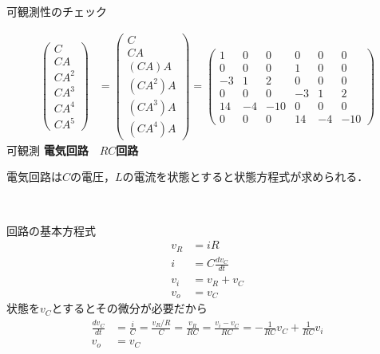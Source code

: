 \documentclass[a4paper,11pt]{jreport}
\begin{document}
可観測性のチェック

\begin{align}
 \left(\begin{array}{l}
        C \\
        CA \\
        CA^2  \\
	CA^3 \\
	CA^4 \\
	CA^5
       \end{array}\right)
 &=
 \left(\begin{array}{l}
        C \\
        CA \\
        (CA)A  \\
	(CA^2)A \\
	(CA^3)A \\
	(CA^4)A
       \end{array}\right)
 =
 \left(\begin{array}{rrrrrr}
        1 & 0 & 0 & 0 & 0 & 0      \\
        0 & 0 & 0 & 1 & 0 & 0      \\
        -3& 1 & 2 & 0 & 0 & 0      \\
	0 & 0 & 0 & -3& 1 & 2 \\
	14& -4&-10& 0 & 0 & 0 \\
	0 & 0 & 0 & 14& -4&-10
       \end{array}\right)
\nonumber
\end{align}
可観測
\newpage
\noindent
{\bf 電気回路　$RC$回路}

電気回路は$C$の電圧，$L$の電流を状態とすると状態方程式が求められる．
\begin{figure}[htbp]
 \begin{center}
 \end{center}
\end{figure}

回路の基本方程式
\begin{align*}
	v_R &= i R \\
	i & = C \frac{d v_C}{dt} \\
	v_i & = v_R + v_C \\
	v_o & = v_C
\end{align*}
状態を$v_C$とするとその微分が必要だから
\begin{align*}
	\frac{d v_C}{dt} 
	&= \frac{i}{C} 
	= \frac{v_R/R}{C} 
	= \frac{v_R}{RC} 
	= \frac{v_i - v_C}{RC} 
	= - \frac{1}{RC} v_C + \frac{1}{RC} v_i \\
	v_o & = v_C
\end{align*}
\newpage
\end{document}
